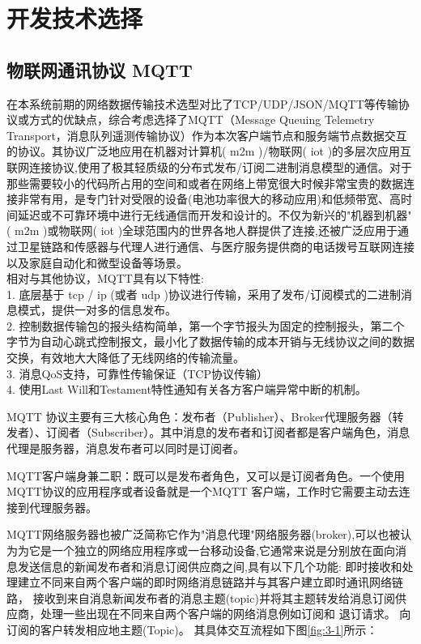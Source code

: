 \section{开发技术选择}

\subsection{物联网通讯协议  MQTT}

在本系统前期的网络数据传输技术选型对比了TCP/UDP/JSON/MQTT等传输协议或方式的优缺点，综合考虑选择了MQTT（Message Queuing Telemetry Transport，消息队列遥测传输协议）作为本次客户端节点和服务端节点数据交互的协议。其协议广泛地应用在机器对计算机( m2m )/物联网( iot )的多层次应用互联网连接协议,使用了极其轻质级的分布式发布/订阅二进制消息模型的通信。对于那些需要较小的代码所占用的空间和或者在网络上带宽很大时候非常宝贵的数据连接非常有用，是专门针对受限的设备(电池功率很大的移动应用)和低频带宽、高时间延迟或不可靠环境中进行无线通信而开发和设计的。不仅为新兴的"机器到机器"( m2m )或物联网( iot )全球范围内的世界各地人群提供了连接,还被广泛应用于通过卫星链路和传感器与代理人进行通信、与医疗服务提供商的电话拨号互联网连接以及家庭自动化和微型设备等场景。
\\ 相对与其他协议，MQTT具有以下特性:
\\1. 底层基于 tcp / ip (或者 udp )协议进行传输，采用了发布/订阅模式的二进制消息模式，提供一对多的信息发布。
\\2. 控制数据传输包的报头结构简单，第一个字节报头为固定的控制报头，第二个字节为自动心跳式控制报文，最小化了数据传输的成本开销与无线协议之间的数据交换，有效地大大降低了无线网络的传输流量。
\\3. 消息QoS支持，可靠性传输保证（TCP协议传输）
\\4. 使用Last Will和Testament特性通知有关各方客户端异常中断的机制。

MQTT 协议主要有三大核心角色：发布者（Publisher）、Broker代理服务器（转发者）、订阅者（Subscriber）。其中消息的发布者和订阅者都是客户端角色，消息代理是服务器，消息发布者可以同时是订阅者。

MQTT客户端身兼二职：既可以是发布者角色，又可以是订阅者角色。一个使用MQTT协议的应用程序或者设备就是一个MQTT 客户端，工作时它需要主动去连接到代理服务器。

MQTT网络服务器也被广泛简称它作为"消息代理"网络服务器(broker),可以也被认为为它是一个独立的网络应用程序或一台移动设备,它通常来说是分别放在面向消息发送信息的新闻发布者和消息订阅供应商之间,具有以下几个功能:
即时接收和处理建立不同来自两个客户端的即时网络消息链路并与其客户建立即时通讯网络链路，
接收到来自消息新闻发布者的消息主题(topic)并将其主题转发给消息订阅供应商，处理一些出现在不同来自两个客户端的网络消息例如订阅和
退订请求。
向订阅的客户转发相应地主题(Topic)。
其具体交互流程如下图\ref{fig:3-1}所示：

